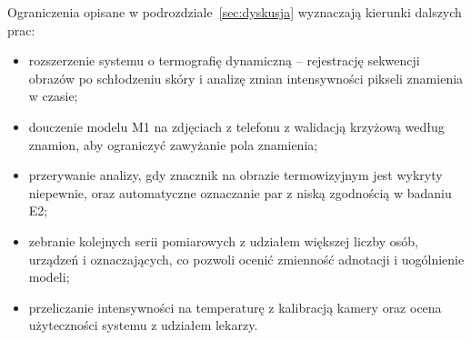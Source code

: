 Ograniczenia opisane w podrozdziale~\ref{sec:dyskusja} wyznaczają kierunki dalszych prac:
\begin{itemize}
  \item rozszerzenie systemu o termografię dynamiczną -- rejestrację sekwencji obrazów po schłodzeniu skóry i analizę zmian intensywności pikseli znamienia w czasie;
  \item douczenie modelu M1 na zdjęciach z telefonu z walidacją krzyżową według znamion, aby ograniczyć zawyżanie pola znamienia;
  \item przerywanie analizy, gdy znacznik na obrazie termowizyjnym jest wykryty niepewnie, oraz automatyczne oznaczanie par z niską zgodnością w badaniu E2;
  \item zebranie kolejnych serii pomiarowych z udziałem większej liczby osób, urządzeń i oznaczających, co pozwoli ocenić zmienność adnotacji i uogólnienie modeli;
  \item przeliczanie intensywności na temperaturę z kalibracją kamery oraz ocena użyteczności systemu z udziałem lekarzy.
\end{itemize}
